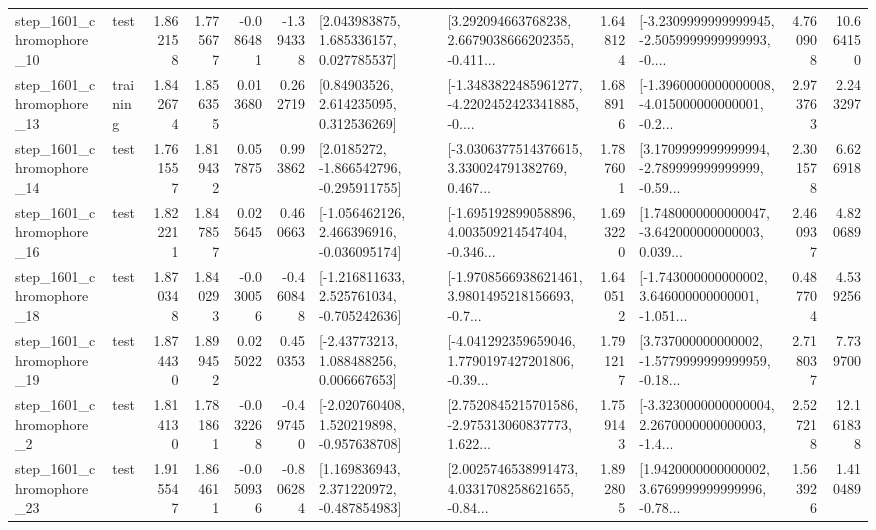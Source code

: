 \begin{tabular}{llrrrrllrlrr}
 step\_1601\_chromophore\_10 &      test &      1.862158 &    1.775677 &     -0.086481 & -1.394338 &     [2.043983875, 1.685336157, 0.027785537] &  [3.292094663768238, 2.6679038666202355, -0.411... &       1.648124 &  [-3.2309999999999945, -2.5059999999999993, -0.... &            4.760908 &         10.664150 \\
 step\_1601\_chromophore\_13 &  training &      1.842674 &    1.856355 &      0.013680 &  0.262719 &      [0.84903526, 2.614235095, 0.312536269] &  [-1.3483822485961277, -4.2202452423341885, -0.... &       1.688916 &  [-1.3960000000000008, -4.015000000000001, -0.2... &            2.973763 &          2.243297 \\
 step\_1601\_chromophore\_14 &      test &      1.761557 &    1.819432 &      0.057875 &  0.993862 &     [2.0185272, -1.866542796, -0.295911755] &  [-3.0306377514376615, 3.330024791382769, 0.467... &       1.787601 &  [3.1709999999999994, -2.789999999999999, -0.59... &            2.301578 &          6.626918 \\
 step\_1601\_chromophore\_16 &      test &      1.822211 &    1.847857 &      0.025645 &  0.460663 &   [-1.056462126, 2.466396916, -0.036095174] &  [-1.695192899058896, 4.003509214547404, -0.346... &       1.693220 &  [1.7480000000000047, -3.642000000000003, 0.039... &            2.460937 &          4.820689 \\
 step\_1601\_chromophore\_18 &      test &      1.870348 &    1.840293 &     -0.030056 & -0.460848 &   [-1.216811633, 2.525761034, -0.705242636] &  [-1.9708566938621461, 3.9801495218156693, -0.7... &       1.640512 &  [-1.743000000000002, 3.646000000000001, -1.051... &            0.487704 &          4.539256 \\
 step\_1601\_chromophore\_19 &      test &      1.874430 &    1.899452 &      0.025022 &  0.450353 &     [-2.43773213, 1.088488256, 0.006667653] &  [-4.041292359659046, 1.7790197427201806, -0.39... &       1.791217 &  [3.737000000000002, -1.5779999999999959, -0.18... &            2.718037 &          7.739700 \\
  step\_1601\_chromophore\_2 &      test &      1.814130 &    1.781861 &     -0.032268 & -0.497450 &   [-2.020760408, 1.520219898, -0.957638708] &  [2.7520845215701586, -2.975313060837773, 1.622... &       1.759143 &  [-3.3230000000000004, 2.2670000000000003, -1.4... &            2.527218 &         12.161838 \\
 step\_1601\_chromophore\_23 &      test &      1.915547 &    1.864611 &     -0.050936 & -0.806284 &    [1.169836943, 2.371220972, -0.487854983] &  [2.0025746538991473, 4.0331708258621655, -0.84... &       1.892805 &  [1.9420000000000002, 3.6769999999999996, -0.78... &            1.563926 &          1.410489 \\

\end{tabular}
